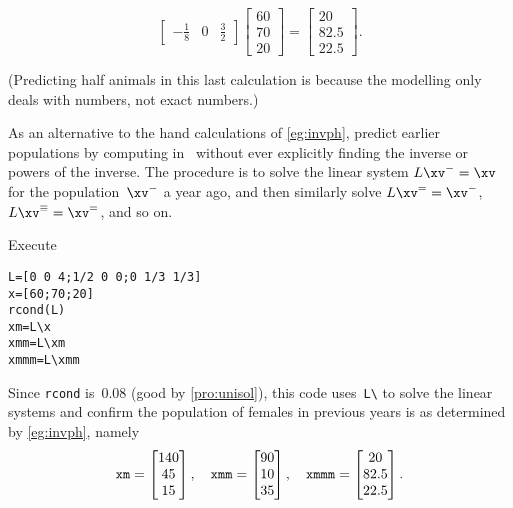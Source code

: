 \begin{example}
\begin{solution}
\begin{itemize}
\begin{equation*}
\begin{bmatrix}
-\frac18&0&\frac32 \end{bmatrix}
\begin{bmatrix} 60\\70\\20 \end{bmatrix}
=\begin{bmatrix} 20\\82.5\\22.5 \end{bmatrix}.
\end{equation*}
\end{itemize}
(Predicting half animals in this last calculation is because the modelling only deals with  numbers, not exact numbers.)
\end{solution}
\end{example}




\begin{example} \label{eg:}
As an alternative to the hand calculations of \autoref{eg:invph}, predict earlier populations by computing in \script\ without ever explicitly finding the inverse or powers of the inverse.
The procedure is to solve the linear system \(L\xv^-=\xv\) for the population~\(\xv^-\) a year ago, and then similarly solve \(L\xv^==\xv^-\), \(L\xv^\equiv=\xv^=\), and so on.
\begin{solution} 
Execute
\setbox\ajrqrbox\hbox{}%
\marginpar{\usebox{\ajrqrbox}}%
\begin{verbatim}
L=[0 0 4;1/2 0 0;0 1/3 1/3]
x=[60;70;20]
rcond(L)
xm=L\x
xmm=L\xm
xmmm=L\xmm
\end{verbatim}
Since \verb|rcond| is~\(0.08\) (good by \autoref{pro:unisol}), this code uses~\verb|L\| to solve the linear systems and confirm the population of females in previous years is as determined by \autoref{eg:invph}, namely
\begin{equation*}
\verb|xm|=\begin{bmatrix} 140 \\ 45 \\ 15 \end{bmatrix},\quad
\verb|xmm|=\begin{bmatrix} 90 \\ 10 \\ 35 \end{bmatrix},\quad
\verb|xmmm|=\begin{bmatrix} 20 \\ 82.5 \\ 22.5 \end{bmatrix}.
\end{equation*} 
\end{solution}
\end{example}













